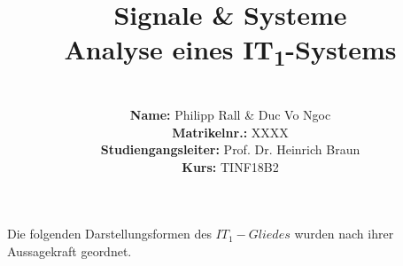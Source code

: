 \documentclass{article}
\title{\textbf{Signale \& Systeme \\ Analyse eines IT\textsubscript{1}-Systems}}
\author{
\vspace{8em} \\
\textbf{Name:} Philipp Rall \& Duc Vo Ngoc \\
\textbf{Matrikelnr.:} XXXX   \\
\textbf{Studiengangsleiter:} Prof. Dr. Heinrich Braun\\
\textbf{Kurs:} TINF18B2 \\
\vspace{8em} 
}
\begin{document}
\maketitle
\newpage
\noindent
Die folgenden Darstellungsformen des $IT_1-Gliedes$ wurden nach ihrer Aussagekraft geordnet.












\end{document}
